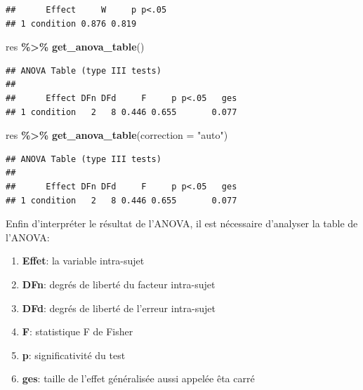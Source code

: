 \documentclass[
]{book}
\newenvironment{Shaded}{\begin{snugshade}}{\end{snugshade}}
\newcommand{\AttributeTok}[1]{\textcolor[rgb]{0.13,0.29,0.53}{#1}}
\newcommand{\FunctionTok}[1]{\textcolor[rgb]{0.13,0.29,0.53}{\textbf{#1}}}
\newcommand{\NormalTok}[1]{#1}
\newcommand{\OtherTok}[1]{\textcolor[rgb]{0.56,0.35,0.01}{#1}}
\newcommand{\SpecialCharTok}[1]{\textcolor[rgb]{0.81,0.36,0.00}{\textbf{#1}}}
\newcommand{\StringTok}[1]{\textcolor[rgb]{0.31,0.60,0.02}{#1}}
\providecommand{\tightlist}{%
  \setlength{\itemsep}{0pt}\setlength{\parskip}{0pt}}
\begin{document}
\begin{Shaded}
\end{Shaded}

\begin{verbatim}
##      Effect     W     p p<.05
## 1 condition 0.876 0.819
\end{verbatim}

\begin{Shaded}
\begin{Highlighting}[]
\NormalTok{res }\SpecialCharTok{\%\textgreater{}\%} \FunctionTok{get\_anova\_table}\NormalTok{()}
\end{Highlighting}
\end{Shaded}

\begin{verbatim}
## ANOVA Table (type III tests)
## 
##      Effect DFn DFd     F     p p<.05   ges
## 1 condition   2   8 0.446 0.655       0.077
\end{verbatim}

\begin{Shaded}
\begin{Highlighting}[]
\NormalTok{res }\SpecialCharTok{\%\textgreater{}\%} \FunctionTok{get\_anova\_table}\NormalTok{(}\AttributeTok{correction =} \StringTok{"auto"}\NormalTok{)}
\end{Highlighting}
\end{Shaded}

\begin{verbatim}
## ANOVA Table (type III tests)
## 
##      Effect DFn DFd     F     p p<.05   ges
## 1 condition   2   8 0.446 0.655       0.077
\end{verbatim}

Enfin d'interpréter le résultat de l'ANOVA, il est nécessaire d'analyser la table de l'ANOVA:

\begin{enumerate}
\def\labelenumi{\arabic{enumi}.}
\tightlist
\item
  \textbf{Effet}: la variable intra-sujet
\item
  \textbf{DFn}: degrés de liberté du facteur intra-sujet
\item
  \textbf{DFd}: degrés de liberté de l'erreur intra-sujet
\item
  \textbf{F}: statistique F de Fisher
\item
  \textbf{p}: significativité du test
\item
  \textbf{ges}: taille de l'effet généralisée aussi appelée êta carré
\end{enumerate}
\end{document}
